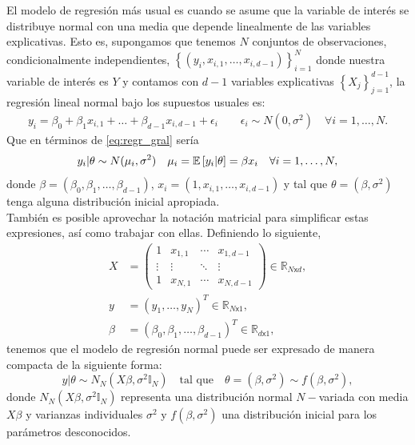 El modelo de regresión más usual es cuando se asume que la variable de interés se distribuye normal con una media que depende linealmente de las variables explicativas. Esto es, supongamos que tenemos $N$ conjuntos de observaciones, condicionalmente independientes, $\left\lbrace(y_i,x_{i,1},\dots,x_{i,d-1})\right\rbrace_{i=1}^{N}$ donde nuestra variable de interés es $Y$ y contamos con $d-1$ variables explicativas $\left\lbrace X_j\right\rbrace_{j=1}^{d-1}$, la regresión lineal normal bajo los supuestos usuales es: 
\begin{align*} 
y_i = \beta_0 + \beta_1 x_{i,1} + \dots + \beta_{d-1} x_{i,d-1} + \epsilon_i \qquad \epsilon_i \sim N(0,\sigma^2) \quad \forall i = 1,\dots, N. 
\end{align*}
Que en términos de \eqref{eq:regr_gral} sería
\begin{equation*}
y_i|\theta \sim N(\mu_i,\sigma^2) \quad \mu_i = \mathbb{E}\left[ y_i|\theta \right] = \beta x_i \quad \forall i = 1, \dots, N,
\end{equation*}
donde $\beta = (\beta_0,\beta_1,\dots,\beta_{d-1})$, $x_i = (1,x_{i,1},\dots,x_{i,d-1})$ y tal que  $\theta = (\beta,\sigma^2)$ tenga alguna distribución inicial apropiada.\\ 

También es posible aprovechar la notación matricial para simplificar estas expresiones, así como trabajar con ellas. Definiendo lo siguiente,  
\begin{align*}
X &= 
\begin{pmatrix}
  1 & x_{1,1} & \cdots & x_{1,d-1} \\
  \vdots & \vdots & \ddots & \vdots  \\
  1 & x_{N,1} & \cdots & x_{N,d-1} 
\end{pmatrix} \in \mathbb{R}_{N\mathsf{x}d}, \\
y &= (y_1,\dots,y_N)^T \in \mathbb{R}_{N\mathsf{x}1},\\
\beta &= (\beta_0,\beta_1,\dots,\beta_{d-1})^T \in \mathbb{R}_{d\mathsf{x}1}, 
\end{align*}
tenemos que el modelo de regresión normal puede ser expresado de manera compacta de la siguiente forma: 
\begin{equation*}
y|\theta \sim N_N(X\beta,\sigma^2\mathbb{I}_N) \quad \text{tal que} \quad \theta = (\beta, \sigma^2) \sim f(\beta,\sigma^2), 
\end{equation*} 
donde $N_N(X\beta,\sigma^2\mathbb{I}_N)$ representa una distribución normal $N-$variada con media $X\beta$ y varianzas individuales $\sigma^2$ y $f(\beta,\sigma^2)$ una distribución inicial para los parámetros desconocidos. 

